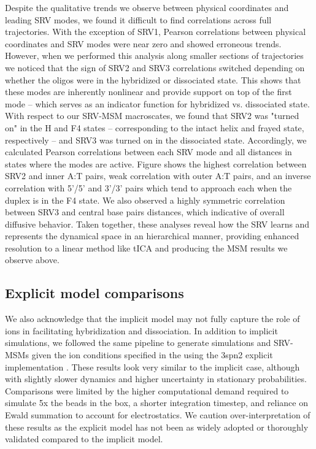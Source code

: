 \documentclass[journal=jpcbfk,manuscript=article]{achemso}
\begin{document}
Despite the qualitative trends we observe between physical coordinates and leading SRV modes, we found it difficult to find correlations across full trajectories. With the exception of SRV1, Pearson correlations between physical coordinates and SRV modes were near zero and showed erroneous trends. However, when we performed this analysis along smaller sections of trajectories we noticed that the sign of SRV2 and SRV3 correlations switched depending on whether the oligos were in the hybridized or dissociated state. This shows that these modes are inherently nonlinear and provide support on top of the first mode -- which serves as an indicator function for hybridized vs. dissociated state. With respect to our SRV-MSM macroscates, we found that SRV2 was "turned on" in the H and F4 states -- corresponding to the intact helix and frayed state, respectively -- and SRV3 was turned on in the dissociated state. Accordingly, we calculated Pearson correlations between each SRV mode and all distances in states where the modes are active. Figure \label{fig:GC-core_tracking_modes} shows the highest correlation between SRV2 and inner A:T pairs, weak correlation with outer A:T pairs, and an inverse correlation with 5'/5' and 3'/3' pairs which tend to approach each when the duplex is in the F4 state. We also observed a highly symmetric correlation between SRV3 and central base pairs distances, which indicative of overall diffusive behavior. Taken together, these analyses reveal how the SRV learns and represents the dynamical space in an hierarchical manner, providing enhanced resolution to a linear method like tICA and producing the MSM results we observe above.


\subsection{Explicit model comparisons}

We also acknowledge that the implicit model may not fully capture the role of ions in facilitating hybridization and dissociation. In addition to implicit simulations, we followed the same pipeline to generate simulations and SRV-MSMs given the ion conditions specified in the \citet{Sanstead2016} using the 3spn2 explicit implementation \citep{Hinckley2015}. These results look very similar to the implicit case, although with slightly slower dynamics and higher uncertainty in stationary probabilities. Comparisons were limited by the higher computational demand required to simulate 5x the beads in the box, a shorter integration timestep, and reliance on Ewald summation to account for electrostatics. We caution over-interpretation of these results as the explicit model has not been as widely adopted or thoroughly validated compared to the implicit model.
\end{document}
